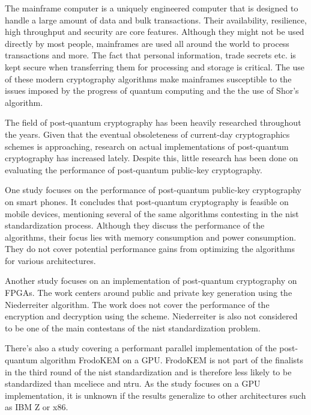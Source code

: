 The mainframe computer is a uniquely engineered computer that is designed to handle a large amount of data and bulk transactions. Their availability, resilience, high throughput and security are core features. Although they might not be used directly by most people, mainframes are used all around the world to process transactions and more. The fact that personal information, trade secrets etc. is kept secure when transferring them for processing and storage is critical. The use of these modern cryptography algorithms make mainframes susceptible to the issues imposed by the progress of quantum computing and the the use of Shor's algorithm.

The field of post-quantum cryptography has been heavily researched throughout the years. Given that the eventual obsoleteness of current-day cryptographics schemes is approaching, research on actual implementations of post-quantum cryptography has increased lately. Despite this, little research has been done on evaluating the performance of post-quantum public-key cryptography.

One study focuses on the performance of post-quantum public-key cryptography on smart phones. It concludes that post-quantum cryptography is feasible on mobile devices, mentioning several of the same algorithms contesting in the \gls{nist} standardization process. Although they discuss the performance of the algorithms, their focus lies with memory consumption and power consumption. They do not cover potential performance gains from optimizing the algorithms for various architectures.%

Another study focuses on an implementation of post-quantum cryptography on FPGAs. The work centers around public and private key generation using the Niederreiter algorithm. The work does not cover the performance of the encryption and decryption using the scheme. Niederreiter is also not considered to be one of the main contestans of the \gls{nist} standardization problem.%

There's also a study covering a performant parallel implementation of the post-quantum algorithm FrodoKEM on a GPU. FrodoKEM is not part of the finalists in the third round of the \gls{nist} standardization and is therefore less likely to be standardized than \gls{mceliece} and \gls{ntru}\cite{nist2020}. As the study focuses on a GPU implementation, it is unknown if the results generalize to other architectures such as IBM Z or x86.%

